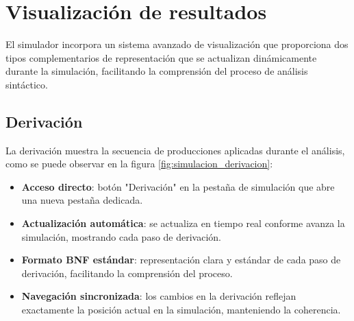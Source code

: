 \section{Visualización de resultados}

El simulador incorpora un sistema avanzado de visualización que proporciona dos tipos complementarios de representación que se actualizan dinámicamente durante la simulación, facilitando la comprensión del proceso de análisis sintáctico.

\subsection{Derivación}

La derivación muestra la secuencia de producciones aplicadas durante el análisis, como se puede observar en la figura \ref{fig:simulacion_derivacion}:

\begin{itemize}
    \item \textbf{Acceso directo}: botón \string"Derivación\string" en la pestaña de simulación que abre una nueva pestaña dedicada.
    \item \textbf{Actualización automática}: se actualiza en tiempo real conforme avanza la simulación, mostrando cada paso de derivación.
    \item \textbf{Formato BNF estándar}: representación clara y estándar de cada paso de derivación, facilitando la comprensión del proceso.
    \item \textbf{Navegación sincronizada}: los cambios en la derivación reflejan exactamente la posición actual en la simulación, manteniendo la coherencia.
\end{itemize}

